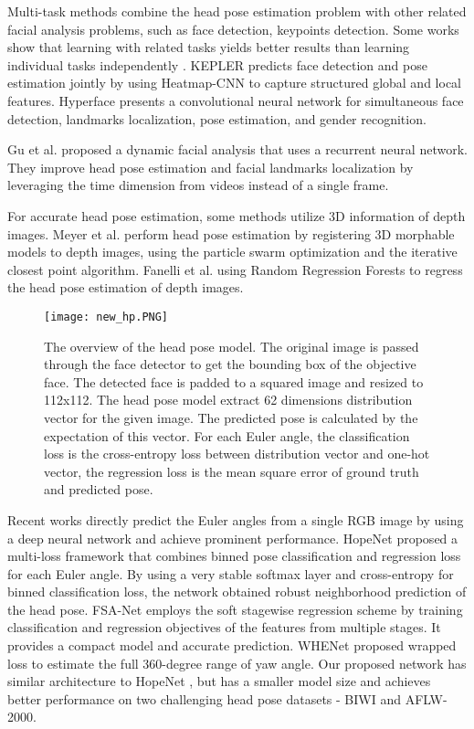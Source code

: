 \documentclass[a4paper,twoside]{article}
\begin{document}
Multi-task methods combine the head pose estimation problem with other related facial analysis problems, such as face detection, keypoints detection. Some works show that learning with related tasks yields better results than learning individual tasks independently \cite{chen2014joint,kumar2017kepler,zhu2012face,ranjan2017all}. KEPLER \cite{kumar2017kepler} predicts face detection and pose estimation jointly by using Heatmap-CNN to capture structured global and local features. Hyperface \cite{ranjan2017hyperface} presents a convolutional neural network for simultaneous face detection, landmarks localization, pose estimation, and gender recognition.

Gu et al. \cite{gu2017dynamic} proposed a dynamic facial analysis that uses a recurrent neural network. They improve head pose estimation and facial landmarks localization by leveraging the time dimension from videos instead of a single frame.

For accurate head pose estimation, some methods utilize 3D information of depth images. Meyer et al. \cite{meyer2015robust} perform head pose estimation by registering 3D morphable models to depth images, using the particle swarm optimization and the iterative closest point algorithm. Fanelli et al. \cite{fanelli2011real} using Random Regression Forests to regress the head pose estimation of depth images. 

\begin{figure*}[htp]
    \centering
    \texttt{[image: new\_hp.PNG]}
    \caption{The overview of the head pose model. The original image is passed through the face detector to get the bounding box of the objective face. The detected face is padded to a squared image and resized to 112x112. The head pose model extract 62 dimensions distribution vector for the given image. The predicted pose is calculated by the expectation of this vector. For each Euler angle, the classification loss is the cross-entropy loss between distribution vector and one-hot vector, the regression loss is the mean square error of ground truth and predicted pose.}
    \label{fig:galaxy}
\end{figure*}
Recent works directly predict the Euler angles from a single RGB image by using a deep neural network and achieve prominent performance. HopeNet \cite{ruiz2018fine} proposed a multi-loss framework that combines binned pose classification and regression loss for each Euler angle. By using a very stable softmax layer and cross-entropy for binned classification loss, the network obtained robust neighborhood prediction of the head pose. FSA-Net \cite{yang2019fsa} employs the soft stagewise regression scheme by training classification and regression objectives of the features from multiple stages. It provides a compact model and accurate prediction. WHENet \cite{zhou2020whenet} proposed wrapped loss to estimate the full 360-degree range of yaw angle. Our proposed network has similar architecture to HopeNet \cite{ruiz2018fine}, but has a smaller model size and achieves better performance on two challenging head pose datasets - BIWI and AFLW-2000.
\end{document}
